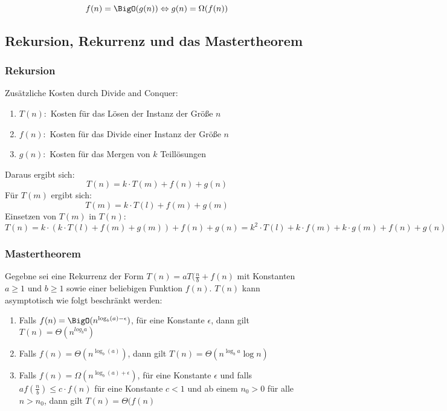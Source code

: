 		$$f(n)=\BigO(g(n))\Leftrightarrow g(n)=\Omega(f(n))$$
		\subsection{Rekursion, Rekurrenz und das Mastertheorem}
		\subsubsection{Rekursion}
		Zusätzliche Kosten durch Divide and Conquer: \newline
		\begin{enumerate}
			\item $T(n): $ Kosten für das Lösen der Instanz der Größe $n$
			\item $f(n): $ Kosten für das Divide einer Instanz der Größe $n$
			\item $g(n): $ Kosten für das Mergen von $k$ Teillösungen
		\end{enumerate}
		Daraus ergibt sich: 
		$$
			T(n) = k \cdot T(m) + f(n) + g(n)
		$$
		Für $T(m)$ ergibt sich:
		$$
			T(m) = k \cdot T(l) + f(m) + g(m)
		$$
		Einsetzen von $T(m)$ in $T(n)$:
		$$
			T(n) = k \cdot (k \cdot T(l) + f(m) + g(m)) + f(n) + g(n) = k^2 \cdot T(l) + k \cdot f(m)+ k \cdot g(m) + f(n) + g(n)
		$$
		\subsubsection{Mastertheorem}
			Gegebne sei eine Rekurrenz der Form $T(n) = aT(\frac{n}{b}+f(n)$ mit Konstanten $a\geq 1$ und $b\geq 1$ sowie einer beliebigen Funktion $f(n)$. $T(n)$ kann asymptotisch wie folgt beschränkt werden:
			\begin{enumerate}
				\item Falls $f(n)=\BigO(n^{\log_b(a)-\epsilon})$, für eine Konstante $\epsilon$, dann gilt $T(n)=\Theta(n^{log_ba})$
				\item Falls $f(n)=\Theta(n^{\log_b(a)})$, dann gilt $T(n)=\Theta (n^{\log_ba}\log n)$
				\item Falls $f(n)=\Omega(n^{\log_b(a)+\epsilon})$, für eine Konstante $\epsilon$ und falls $af(\frac{n}{b})\leq c\cdot f(n)$ für eine Konstante $c<1$ und ab einem $n_0>0$ für alle $n>n_0$, dann gilt $T(n)=\Theta(f(n)$
			\end{enumerate}
